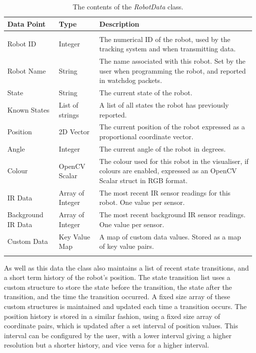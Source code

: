 \clearpage
\begin{longtable}{ l l p{8cm} }
\caption[Robot Data Contents]{The contents of the \textit{RobotData} class.}\\
 \hline
 Data Point & Type & Description\\
 \hline\\
 Robot ID & Integer & The numerical ID of the robot, used by the tracking system and when transmitting data.\\
 Robot Name & String & The name associated with this robot. Set by the user when programming the robot, and reported in watchdog packets. \\
 State & String & The current state of the robot. \\
 Known States & List of strings & A list of all states the robot has previously reported. \\
 Position & 2D Vector & The current position of the robot expressed as a proportional coordinate vector. \\
 Angle & Integer & The current angle of the robot in degrees. \\
 Colour & OpenCV Scalar & The colour used for this robot in the visualiser, if colours are enabled, expressed as an OpenCV Scalar struct in RGB format. \\
 IR Data & Array of Integer & The most recent IR sensor readings for this robot. One value per sensor. \\
 Background IR Data & Array of Integer & The most recent background IR sensor readings. One value per sensor. \\
 Custom Data & Key Value Map & A map of custom data values. Stored as a map of key value pairs. \\
 
 \label{tab:RobotDataContents}
\end{longtable}

As well as this data the class also maintains a list of recent state transitions, and a short term history of the robot's position. The state transition list uses a custom structure to store the state before the transition, the state after the transition, and the time the transition occurred. A fixed size array of these custom structures is maintained and updated each time a transition occurs. The position history is stored in a similar fashion, using a fixed size array of coordinate pairs, which is updated after a set interval of position values. This interval can be configured by the user, with a lower interval giving a higher resolution but a shorter history, and vice versa for a higher interval.

